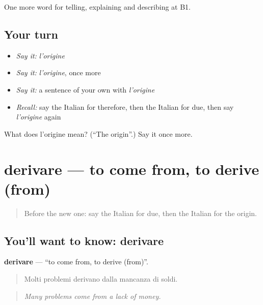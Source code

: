 \begin{grammarlens}[title={What you've built}]
One more word for telling, explaining and describing at B1.
\end{grammarlens}

\subsection*{Your turn}
\begin{itemize}
\raggedright
  \item \emph{Say it:} \emph{l'origine}
  \item \emph{Say it:} \emph{l'origine}, once more
  \item \emph{Say it:} a sentence of your own with \emph{l'origine}
  \item \emph{Recall:} say the Italian for therefore, then the Italian for due, then say \emph{l'origine} again
\end{itemize}

\begin{tcolorbox}[breakable,colback=teal!4,colframe=teal!35!black,title={Before you move on}]
What does l'origine mean? (\textquotedblleft{}The origin\textquotedblright{}.) Say it once more.
\end{tcolorbox}
\section[derivare]{derivare — to come from, to derive (from)}

\label{lesson:IT-C351-derivare}



\begin{quote}
Before the new one: say the Italian for due, then the Italian for the origin.
\end{quote}

\subsection*{You'll want to know: derivare}
\textbf{derivare} — \textquotedblleft{}to come from, to derive (from)\textquotedblright{}.

\begin{quote}
Molti problemi derivano dalla mancanza di soldi.
\end{quote}

\begin{quote}
\emph{Many problems come from a lack of money.}
\end{quote}

